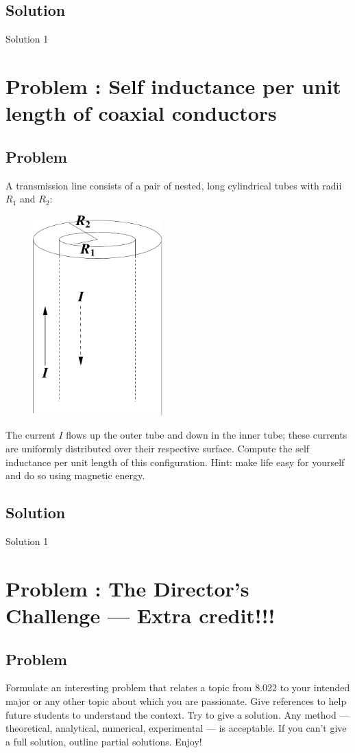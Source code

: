 \documentclass[solutions]{esg8022pset}
\begin{document}
\subsection{Solution}
  Solution 1
\section{Problem \thesection: Self inductance per unit length of coaxial conductors }
\subsection{Problem}
A transmission line consists of a pair of nested, long cylindrical
tubes with radii $R_1$ and $R_2$:

  \begin{figure}[H]
    \centering
    \includegraphics[width = 5cm]{coaxind}
    \label{fig:coax}
  \end{figure}

\par\noindent The current $I$ flows up the outer tube and down in the
inner tube; these currents are uniformly distributed over their
respective surface.  Compute the self inductance per unit length of
this configuration.  Hint: make life easy for yourself and do so using
magnetic energy.
\subsection{Solution}
  Solution 1
\section{Problem \thesection: The Director's Challenge --- Extra credit!!!}
\subsection{Problem}
   Formulate an interesting problem that relates a topic from 8.022 to your
  intended major or any other topic about which you are passionate.  Give references
  to help future students to understand the context.  Try to give a solution.
  Any method --- theoretical, analytical, numerical, experimental --- is acceptable.
  If you can't give a full solution, outline partial solutions. Enjoy!
\end{document}
